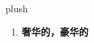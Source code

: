 
\begin{frame}
{\huge plush}
\begin{center}
\begin{enumerate}\Large
  \item \textbf{奢华的，豪华的}
\end{enumerate}
\end{center}
\end{frame}
